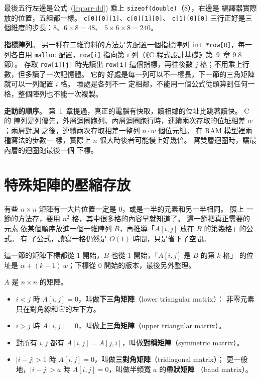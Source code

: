 最後五行左邊是公式~(\ref{eq:arr-dd}) 乘上 \texttt{sizeof(double)}（$8$），右邊是
編譯器實際放的位置，五組都一樣。 \texttt{c[0][0][1]}、\texttt{c[0][1][0]}、
\texttt{c[1][0][0]} 三行正好是三個維度的步長：$8$、$6 \times 8 = 48$、
$5 \times 6 \times 8 = 240$。

\textbf{指標陣列}。 另一種存二維資料的方法是先配置一個指標陣列
\texttt{int *row[R]}，每一列各自用 \texttt{malloc} 配置，\texttt{row[i]} 指向第 $i$
列（《C 程式設計基礎》第~9~章 9.8 節）。 存取 \texttt{row[i][j]} 時先讀出
\texttt{row[i]} 這個指標，再往後數 $j$ 格；不用乘上行數，但多讀了一次記憶體。 它的
好處是每一列可以不一樣長，下一節的三角矩陣就可以一列配置 $i$ 格。 壞處是各列不一
定相鄰，不能用一個公式從頭算到任何一格，整個陣列也不能一次複製。

\textbf{走訪的順序}。 第~1~章提過，真正的電腦有快取，讀相鄰的位址比跳著讀快。 C 的
陣列是列優先，外層迴圈跑列、內層迴圈跑行時，連續兩次存取的位址相差 $w$；兩層對調
之後，連續兩次存取相差一整列 $n \cdot w$ 個位元組。 在 RAM 模型裡兩種寫法的步數一
樣，實際上 $n$ 很大時後者可能慢上好幾倍。 寫雙層迴圈時，讓最內層的迴圈跑最後一個
下標。

\section{特殊矩陣的壓縮存放}
\label{sec:arr-special}

有些 $n \times n$ 矩陣有一大片位置一定是 $0$，或是一半的元素和另一半相同。 照上
一節的方法存，要用 $n^2$ 格，其中很多格的內容早就知道了。 這一節把真正需要的元素
依某個順序放進一個一維陣列 $B$，再推導「$A[i, j]$ 放在 $B$ 的第幾格」的公式。 有
了公式，讀寫一格仍然是 $O(1)$ 時間，只是省下了空間。

這一節的矩陣下標都從 $1$ 開始，$B$ 也從 $1$ 開始，「$A[i, j]$ 是 $B$ 的第 $k$ 格」
的位址是 $\alpha + (k - 1)\,w$；下標從 $0$ 開始的版本，最後另外整理。

\begin{definition}[特殊矩陣]
\label{def:arr-special}
$A$ 是 $n \times n$ 的矩陣。
\begin{itemize}
\item $i < j$ 時 $A[i, j] = 0$，叫做\textbf{下三角矩陣}（lower triangular matrix）：
非零元素只在對角線和它的左下方。
\item $i > j$ 時 $A[i, j] = 0$，叫做\textbf{上三角矩陣}（upper triangular matrix）。
\item 對所有 $i, j$ 都有 $A[i, j] = A[j, i]$，叫做\textbf{對稱矩陣}（symmetric
matrix）。
\item $|i - j| > 1$ 時 $A[i, j] = 0$，叫做\textbf{三對角矩陣}（tridiagonal matrix）；
更一般地，$|i - j| > a$ 時 $A[i, j] = 0$，叫做半頻寬 $a$ 的\textbf{帶狀矩陣}
（band matrix）。
\end{itemize}
\end{definition}

